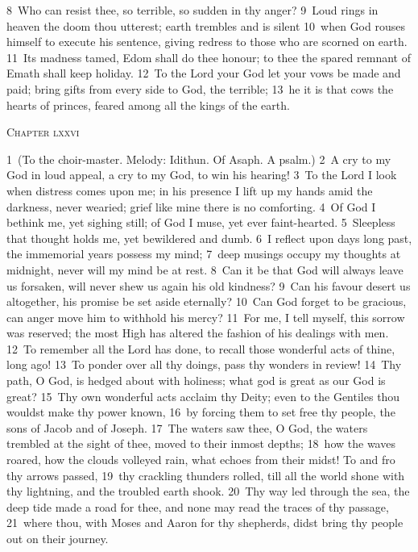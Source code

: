 \documentclass[10pt]{book} %
\begin{document}
\textcolor{benred8}{8}~Who can resist thee, so terrible, so sudden in thy anger? \textcolor{benred8}{9}~Loud rings in heaven the doom thou utterest; earth trembles and is silent \textcolor{benred8}{10}~when God rouses himself to execute his sentence, giving redress to those who are scorned on earth. \textcolor{benred8}{11}~Its madness tamed, Edom shall do thee honour; to thee the spared remnant of Emath shall keep holiday. \textcolor{benred8}{12}~To the Lord your God let your vows be made and paid; bring gifts from every side to God, the terrible; \textcolor{benred8}{13}~he it is that cows the hearts of princes, feared among all the kings of the earth.
\begin{large}\begin{center}\textsc{Chapter lxxvi}\end{center}\end{large}
\textcolor{benred8}{1}~(To the choir-master. Melody: Idithun. Of Asaph. A psalm.)
\textcolor{benred8}{2}~A cry to my God in loud appeal, a cry to my God, to win his hearing! \textcolor{benred8}{3}~To the Lord I look when distress comes upon me; in his presence I lift up my hands amid the darkness, never wearied; grief like mine there is no comforting. \textcolor{benred8}{4}~Of God I bethink me, yet sighing still; of God I muse, yet ever faint-hearted. \textcolor{benred8}{5}~Sleepless that thought holds me, yet bewildered and dumb. \textcolor{benred8}{6}~I reflect upon days long past, the immemorial years possess my mind; \textcolor{benred8}{7}~deep musings occupy my thoughts at midnight, never will my mind be at rest. \textcolor{benred8}{8}~Can it be that God will always leave us forsaken, will never shew us again his old kindness? \textcolor{benred8}{9}~Can his favour desert us altogether, his promise be set aside eternally? \textcolor{benred8}{10}~Can God forget to be gracious, can anger move him to withhold his mercy? \textcolor{benred8}{11}~For me, I tell myself, this sorrow was reserved; the most High has altered the fashion of his dealings with men.
\textcolor{benred8}{12}~To remember all the Lord has done, to recall those wonderful acts of thine, long ago! \textcolor{benred8}{13}~To ponder over all thy doings, pass thy wonders in review! \textcolor{benred8}{14}~Thy path, O God, is hedged about with holiness; what god is great as our God is great? \textcolor{benred8}{15}~Thy own wonderful acts acclaim thy Deity; even to the Gentiles thou wouldst make thy power known, \textcolor{benred8}{16}~by forcing them to set free thy people, the sons of Jacob and of Joseph. \textcolor{benred8}{17}~The waters saw thee, O God, the waters trembled at the sight of thee, moved to their inmost depths; \textcolor{benred8}{18}~how the waves roared, how the clouds volleyed rain, what echoes from their midst! To and fro thy arrows passed, \textcolor{benred8}{19}~thy crackling thunders rolled, till all the world shone with thy lightning, and the troubled earth shook. \textcolor{benred8}{20}~Thy way led through the sea, the deep tide made a road for thee, and none may read the traces of thy passage, \textcolor{benred8}{21}~where thou, with Moses and Aaron for thy shepherds, didst bring thy people out on their journey.
\end{document}
